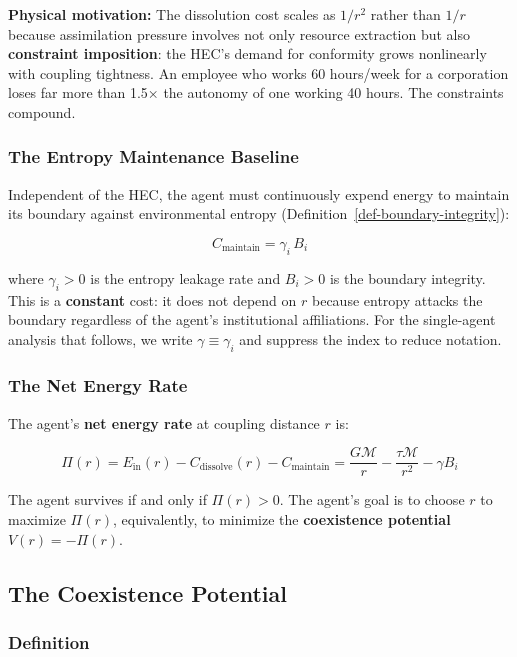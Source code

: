 \documentclass[11pt]{article}
\theoremstyle{plain}
\theoremstyle{definition}
\theoremstyle{remark}
\let\origsubsection\subsection
\renewcommand{\subsection}{\needspace{7\baselineskip}\origsubsection}
\let\origsubsubsection\subsubsection
\renewcommand{\subsubsection}{\needspace{4\baselineskip}\origsubsubsection}
\begin{document}
\textbf{Physical motivation:} The dissolution cost scales as \(1/r^2\)
rather than \(1/r\) because assimilation pressure involves not only
resource extraction but also \textbf{constraint imposition}: the HEC's
demand for conformity grows nonlinearly with coupling tightness. An
employee who works 60 hours/week for a corporation loses far more than
1.5× the autonomy of one working 40 hours. The constraints compound.

\subsubsection{The Entropy Maintenance
Baseline}\label{the-entropy-maintenance-baseline}

Independent of the HEC, the agent must continuously expend energy to
maintain its boundary against environmental entropy
(Definition~\ref{def-boundary-integrity}):

\[C_{\text{maintain}} = \gamma_i \, B_i\]

where \(\gamma_i > 0\) is the entropy leakage rate and \(B_i > 0\) is
the boundary integrity. This is a \textbf{constant} cost: it does not
depend on \(r\) because entropy attacks the boundary regardless of the
agent's institutional affiliations. For the single-agent analysis that
follows, we write \(\gamma \equiv \gamma_i\) and suppress the index to
reduce notation.

\subsubsection{The Net Energy Rate}\label{the-net-energy-rate}

The agent's \textbf{net energy rate} at coupling distance \(r\) is:

\[\Pi(r) = E_{\text{in}}(r) - C_{\text{dissolve}}(r) - C_{\text{maintain}} = \frac{G \mathcal{M}}{r} - \frac{\tau \mathcal{M}}{r^2} - \gamma B_i\]

The agent survives if and only if \(\Pi(r) > 0\). The agent's goal is to
choose \(r\) to maximize \(\Pi(r)\), equivalently, to minimize the
\textbf{coexistence potential} \(V(r) = -\Pi(r)\).

\subsection{The Coexistence Potential}\label{the-coexistence-potential}

\subsubsection{Definition}\label{definition}
\end{document}
